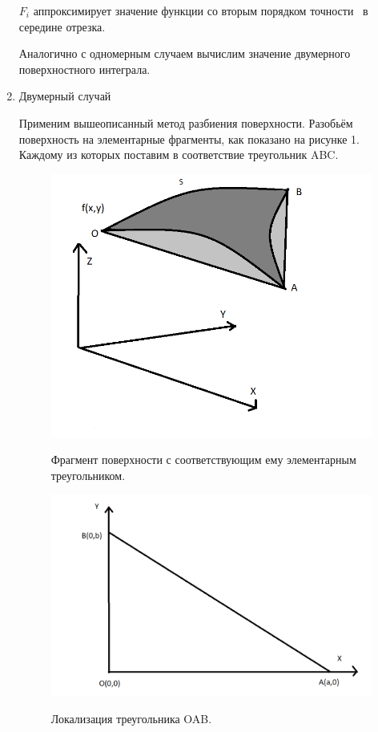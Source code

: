 \documentclass{article}
\begin{document}
\begin{enumerate}
$F_i$ аппроксимирует значение функции со вторым порядком точности~\cite{litlink:samarskiy} в середине отрезка.

Аналогично с одномерным случаем вычислим значение двумерного поверхностного интеграла.

\item Двумерный случай

Применим вышеописанный метод разбиения поверхности. Разобьём поверхность на элементарные фрагменты, как показано на рисунке 1. Каждому из которых поставим в соответствие треугольник ABC.

\begin{figure}[H]
\centering
\includegraphics[width=0.8\linewidth]{triangleL.png}
\caption[]{}
\label{fig:L}
Фрагмент поверхности с соответствующим ему элементарным треугольником.
\end{figure}

\begin{figure}[H]
\centering
\includegraphics[width=0.8\linewidth]{triangleOAB.png}
\caption[]{}
\label{fig:ABC}
Локализация треугольника OAB.
\end{figure}


\end{enumerate}
\end{document}
